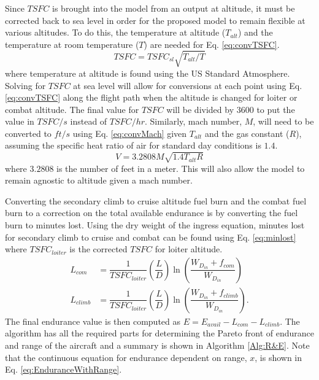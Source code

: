 Since $TSFC$ is brought into the model from an output at altitude, it must be corrected back to sea level in order for the proposed model to remain flexible at various altitudes. To do this, the temperature at altitude ($T_{alt}$) and the temperature at room temperature ($T$) are needed for Eq. \ref{eq:convTSFC}.
\begin{equation}
    TSFC = TSFC_{sl}\sqrt{T_{alt}/T}
    \label{eq:convTSFC}
\end{equation}
where temperature at altitude is found using the US Standard Atmosphere.
Solving for $TSFC$ at sea level will allow for conversions at each point  using Eq. \ref{eq:convTSFC} along the flight path when the altitude is changed for loiter or combat altitude. The final value for $TSFC$ will be divided by $3600$ to put the value in $TSFC/s$ instead of $TSFC/hr$. Similarly, mach number, $M$, will need to be converted to $ft/s$ using Eq. \ref{eq:convMach} given $T_{alt}$ and the gas constant ($R$), assuming the specific heat ratio of air for standard day conditions is $1.4$.
\begin{equation}
    V = 3.2808M\sqrt{1.4T_{alt}R}
    \label{eq:convMach}
\end{equation}
where $3.2808$ is the number of feet in a meter. This will also allow the model to remain agnostic to altitude given a mach number.\par
Converting the secondary climb to cruise altitude fuel burn and the combat fuel burn to a correction on the total available endurance is by converting the fuel burn to minutes lost. Using the dry weight of the ingress equation, minutes lost for secondary climb to cruise and combat can be found using Eq. \ref{eq:minlost} where $TSFC_{loiter}$ is the corrected $TSFC$ for loiter altitude.
\begin{equation}
\label{eq:minlost}
\begin{aligned}
    L_{com} &= \dfrac{1}{TSFC_{loiter}}\left(\dfrac{L}{D}\right)\ln\left(\dfrac{W_{D_{in}}+f_{com}}{W_{D_{in}}}\right)\\
    L_{climb} &=\dfrac{1}{TSFC_{loiter}}\left(\dfrac{L}{D}\right)\ln\left(\dfrac{W_{D_{in}}+f_{climb}}{W_{D_{in}}}\right).
\end{aligned}
\end{equation}
The final endurance value is then computed as $E = E_{avail}-L_{com}-L_{climb}$. The algorithm has all the required parts for determining the Pareto front of endurance and range of the aircraft and a summary is shown in Algorithm \ref{Alg:R&E}. Note that the continuous equation for endurance dependent on range, $x$, is shown in Eq. \ref{eq:EnduranceWithRange}.
